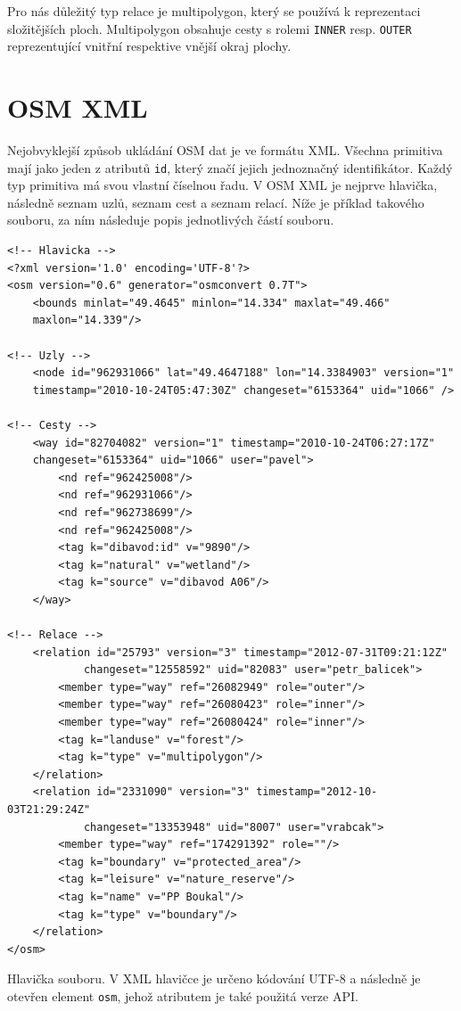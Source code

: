 Pro nás důležitý typ relace je multipolygon, který se používá k reprezentaci
složitějších ploch. Multipolygon obsahuje cesty s rolemi \verb|INNER| resp.
\verb|OUTER| reprezentující vnitřní respektive vnější okraj plochy.

\section{OSM XML}
Nejobvyklejší způsob ukládání OSM dat je ve formátu XML. Všechna primitiva mají
jako jeden z atributů \verb|id|, který značí jejich jednoznačný identifikátor.
Každý typ primitiva má svou vlastní číselnou řadu. V OSM XML\cite{osmxml} je
nejprve hlavička, následně seznam uzlů, seznam cest a seznam relací. Níže je
příklad takového souboru, za ním následuje popis jednotlivých částí souboru.

\begin{verbatim}
<!-- Hlavicka -->
<?xml version='1.0' encoding='UTF-8'?>
<osm version="0.6" generator="osmconvert 0.7T">
	<bounds minlat="49.4645" minlon="14.334" maxlat="49.466" 
	maxlon="14.339"/>

<!-- Uzly -->
	<node id="962931066" lat="49.4647188" lon="14.3384903" version="1" 
	timestamp="2010-10-24T05:47:30Z" changeset="6153364" uid="1066" />

<!-- Cesty -->
	<way id="82704082" version="1" timestamp="2010-10-24T06:27:17Z" 
	changeset="6153364" uid="1066" user="pavel">
	    <nd ref="962425008"/>
	    <nd ref="962931066"/>
	    <nd ref="962738699"/>
	    <nd ref="962425008"/>
	    <tag k="dibavod:id" v="9890"/>
	    <tag k="natural" v="wetland"/>
	    <tag k="source" v="dibavod A06"/>
	</way>

<!-- Relace -->
	<relation id="25793" version="3" timestamp="2012-07-31T09:21:12Z" 
			changeset="12558592" uid="82083" user="petr_balicek">
	    <member type="way" ref="26082949" role="outer"/>
	    <member type="way" ref="26080423" role="inner"/>
	    <member type="way" ref="26080424" role="inner"/>
	    <tag k="landuse" v="forest"/>
	    <tag k="type" v="multipolygon"/>
	</relation>
	<relation id="2331090" version="3" timestamp="2012-10-03T21:29:24Z"
			changeset="13353948" uid="8007" user="vrabcak">
	    <member type="way" ref="174291392" role=""/>
	    <tag k="boundary" v="protected_area"/>
	    <tag k="leisure" v="nature_reserve"/>
	    <tag k="name" v="PP Boukal"/>
	    <tag k="type" v="boundary"/>
	</relation>
</osm>
\end{verbatim}

{\tuc Hlavička souboru.} V XML hlavičce je určeno kódování UTF-8 a následně je
otevřen element \verb|osm|, jehož atributem je také použitá verze API. 

